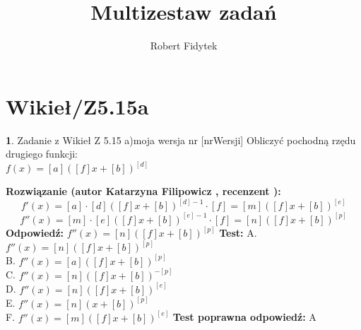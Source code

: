 \documentclass[12pt, a4paper]{article}
\title{Multizestaw zadań}
\author{Robert Fidytek}
\date{}
\theoremstyle{definition} %
\newtheorem{zad}{}
\newcommand{\kategoria}[1]{\section{#1}} %
\newcommand{\zadStart}[1]{\begin{zad}#1\newline} %
\newcommand{\zadStop}{\end{zad}}   %
\newcommand{\rozwStart}[2]{\noindent \textbf{Rozwiązanie (autor #1 , recenzent #2): }\newline} %
\newcommand{\rozwStop}{\newline}                                            %
\newcommand{\odpStart}{\noindent \textbf{Odpowiedź:}\newline}    %
\newcommand{\odpStop}{\newline}                                             %
\newcommand{\testStart}{\noindent \textbf{Test:}\newline} %
\newcommand{\testStop}{\newline} %
\newcommand{\kluczStart}{\noindent \textbf{Test poprawna odpowiedź:}\newline} %
\newcommand{\kluczStop}{\newline} %
\begin{document}
\maketitle


\kategoria{Wikieł/Z5.15a}
\zadStart{Zadanie z Wikieł Z 5.15 a)moja wersja nr [nrWersji]}
Obliczyć  pochodną rzędu drugiego funkcji:\\
$f(x)=[a]([f]x+[b])^{[d]}$
\zadStop
\rozwStart{Katarzyna Filipowicz}{}
$$
f'(x)=[a]\cdot [d]([f]x+[b])^{[d]-1}\cdot [f]=[m]([f]x+[b])^{[e]}
$$ $$
f''(x)=[m]\cdot [e]([f]x+[b])^{[e]-1}\cdot [f]=[n]([f]x+[b])^{[p]}
$$
\rozwStop
\odpStart
$f''(x)=[n]([f]x+[b])^{[p]}$
\odpStop
\testStart
A. $f''(x)=[n]([f]x+[b])^{[p]}$\\
B. $f''(x)=[a]([f]x+[b])^{[p]}$\\
C. $f''(x)=[n]([f]x+[b])^{-[p]}$\\
D. $f''(x)=[n]([f]x+[b])^{[e]}$\\
E. $f''(x)=[n](x+[b])^{[p]}$\\
F. $f''(x)=[m]([f]x+[b])^{[e]}$
\testStop
\kluczStart
A
\kluczStop
\end{document}

